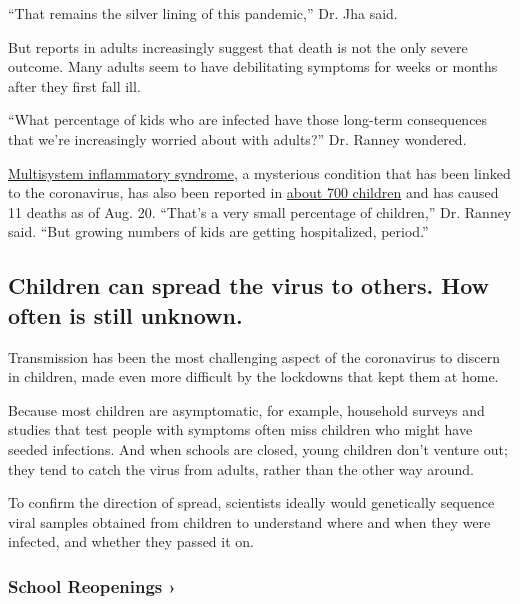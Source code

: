``That remains the silver lining of this pandemic,'' Dr. Jha said.

But reports in adults increasingly suggest that death is not the only
severe outcome. Many adults seem to have debilitating symptoms for weeks
or months after they first fall ill.

``What percentage of kids who are infected have those long-term
consequences that we're increasingly worried about with adults?'' Dr.
Ranney wondered.

\href{https://www.nytimes3xbfgragh.onion/2020/05/19/parenting/pmis-coronavirus-children.html}{Multisystem
inflammatory syndrome}, a mysterious condition that has been linked to
the coronavirus, has also been reported in
\href{https://www.cdc.gov/mis-c/cases/index.html}{about 700 children}
and has caused 11 deaths as of Aug. 20. ``That's a very small percentage
of children,'' Dr. Ranney said. ``But growing numbers of kids are
getting hospitalized, period.''

\hypertarget{children-can-spread-the-virus-to-others-how-often-is-still-unknown}{%
\subsection{Children can spread the virus to others. How often is still
unknown.}\label{children-can-spread-the-virus-to-others-how-often-is-still-unknown}}

Transmission has been the most challenging aspect of the coronavirus to
discern in children, made even more difficult by the lockdowns that kept
them at home.

Because most children are asymptomatic, for example, household surveys
and studies that test people with symptoms often miss children who might
have seeded infections. And when schools are closed, young children
don't venture out; they tend to catch the virus from adults, rather than
the other way around.

To confirm the direction of spread, scientists ideally would genetically
sequence viral samples obtained from children to understand where and
when they were infected, and whether they passed it on.

\href{https://www.nytimes3xbfgragh.onion/spotlight/schools-reopening?action=click\&pgtype=Article\&state=default\&region=MAIN_CONTENT_3\&context=storylines_keepup}{}

\hypertarget{school-reopenings-}{%
\subsubsection{School Reopenings ›}\label{school-reopenings-}}


